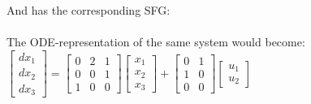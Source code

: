 And has the corresponding SFG:\\\newline
\setlength\fboxsep{0pt}
\setlength\fboxrule{0.5pt}
\\\newline The ODE-representation of the same system would become:\\\newline
$\left[ \begin{array}{c} dx_1 \\ dx_2 \\ dx_3 \end{array} \right]
= \begin{bmatrix} 0 & 2 & 1 \\ 0 & 0 & 1 \\ 1 & 0 & 0 \end{bmatrix} \left[ \begin{array}{c} x_1 \\ x_2 \\ x_3 \end{array} \right] + \begin{bmatrix} 0 & 1 \\ 1 & 0 \\ 0 & 0 \end{bmatrix}  \left[ \begin{array}{c} u_1 \\ u_2 \end{array} \right]$
